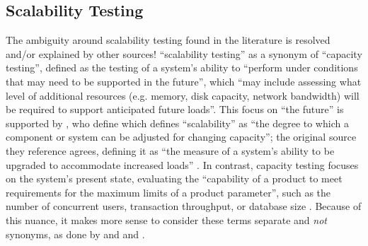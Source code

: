
\subsection{Scalability Testing}
\label{scal-test-rec}

The ambiguity around scalability testing found in the literature is resolved
and/or explained by other sources! \citet[p.~39]{IEEE2021} 
``scalability testing'' as a synonym of ``capacity testing'', defined
as the testing of a system's ability to ``perform under conditions that may
need to be supported in the future'', which ``may include assessing what level
of additional resources (e.g. memory, disk capacity, network bandwidth) will
be required to support anticipated future loads''. This focus on ``the future''
is supported by \citetISTQB{}, \ifnotpaper who define \else which defines \fi
``scalability'' as ``the degree to which a component or system can be adjusted
for changing capacity''\ifnotpaper; the original source they reference agrees,
defining it as ``the measure of a system's ability to be upgraded to
accommodate increased loads'' \citep[p.~381]{GerrardAndThompson2002}\fi. In
contrast, capacity testing focuses on the system's present state, evaluating
the ``capability of a product to meet requirements for the maximum limits of a
product parameter'', such as the number of concurrent users, transaction
throughput, or database size \citep{ISO_IEC2023a}. Because of this nuance, it
makes more sense to consider these terms separate and \emph{not} synonyms, as
done by
\ifnotpaper \citet[p.~53]{Firesmith2015} and \citet[pp.~22-23]{Bas2024}%
\else \cite[p.~53]{Firesmith2015} and \cite[pp.~22-23]{Bas2024}%
\fi.

